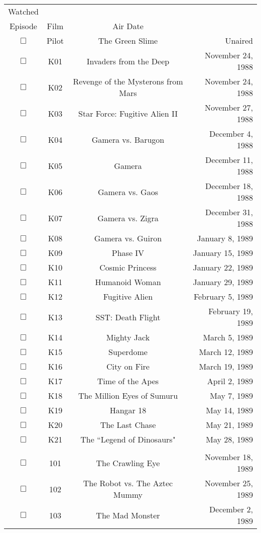 \documentclass[12pt]{article}
\begin{document}
\begin{center}
\begin{longtable}[c]{cccr}

Watched&\begin{tabular}{@{}c@{}}Season/\\Episode\end{tabular}&Film&Air Date\\
\hline
$\Box$&Pilot&The Green Slime&Unaired\\
$\Box$&K01&Invaders from the Deep&November 24, 1988\\
$\Box$&K02&Revenge of the Mysterons from Mars&November 24, 1988\\
$\Box$&K03&Star Force: Fugitive Alien II&November 27, 1988\\
$\Box$&K04&Gamera vs. Barugon&December  4, 1988\\
$\Box$&K05&Gamera&December 11, 1988\\
$\Box$&K06&Gamera vs. Gaos&December 18, 1988\\
$\Box$&K07&Gamera vs. Zigra&December 31, 1988\\
$\Box$&K08&Gamera vs. Guiron&January  8, 1989\\
$\Box$&K09&Phase IV&January 15, 1989\\
$\Box$&K10&Cosmic Princess&January 22, 1989\\
$\Box$&K11&Humanoid Woman&January 29, 1989\\
$\Box$&K12&Fugitive Alien&February  5, 1989\\
$\Box$&K13&SST: Death Flight&February 19, 1989\\
$\Box$&K14&Mighty Jack&March  5, 1989\\
$\Box$&K15&Superdome&March 12, 1989\\
$\Box$&K16&City on Fire&March 19, 1989\\
$\Box$&K17&Time of the Apes&April  2, 1989\\
$\Box$&K18&The Million Eyes of Sumuru&May  7, 1989\\
$\Box$&K19&Hangar 18&May 14, 1989\\
$\Box$&K20&The Last Chase&May 21, 1989\\
$\Box$&K21&The ``Legend of Dinosaurs"&May 28, 1989\\
\\
$\Box$&101&The Crawling Eye&November 18, 1989\\
$\Box$&102&The Robot vs. The Aztec Mummy&November 25, 1989\\
$\Box$&103&The Mad Monster&December  2, 1989\\

\end{longtable}
\end{center}
\end{document}
